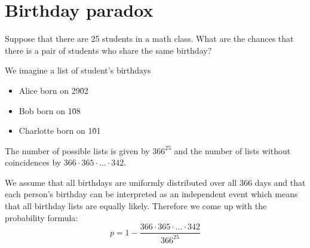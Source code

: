 \section{Birthday paradox}
\begin{question}
Suppose that there are 25 students in a math class. What are the chances that there is a pair of students who share the same birthday?
\end{question}
\begin{answer}
We imagine a list of student's birthdays
\begin{itemize}
\item Alice born on 29\.02
\item Bob born on 1\.08
\item Charlotte born on 1\.01
\end{itemize}
The number of possible lists is given by $366^{25}$ and the number of lists without coincidences by $366\cdot 365\cdot\dots\cdot 342$.

We assume that all birthdays are uniformly distributed over all 366 days and that each person's birthday can be interpreted as an independent event which means that all birthday lists are equally likely. Therefore we come up with the probability formula:
$$
p=1-\frac{366\cdot365\cdot\dots\cdot342}{366^{25}}
$$
\end{answer}

